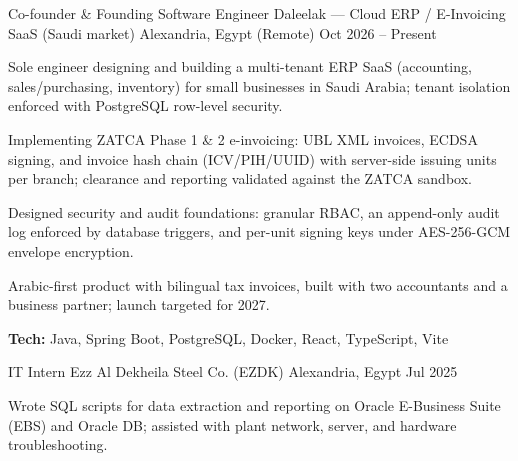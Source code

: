 
\begin{cventries}

  \cventry
    {Co-founder \& Founding Software Engineer}
    {Daleelak --- Cloud ERP / E-Invoicing SaaS (Saudi market)}
    {Alexandria, Egypt (Remote)}
    {Oct 2026 -- Present}
    {
      \begin{cvitems}
        \item {Sole engineer designing and building a multi-tenant ERP SaaS (accounting, sales/purchasing, inventory) for small businesses in Saudi Arabia; tenant isolation enforced with PostgreSQL row-level security.}
        \item {Implementing ZATCA Phase 1 \& 2 e-invoicing: UBL XML invoices, ECDSA signing, and invoice hash chain (ICV/PIH/UUID) with server-side issuing units per branch; clearance and reporting validated against the ZATCA sandbox.}
        \item {Designed security and audit foundations: granular RBAC, an append-only audit log enforced by database triggers, and per-unit signing keys under AES-256-GCM envelope encryption.}
        \item {Arabic-first product with bilingual tax invoices, built with two accountants and a business partner; launch targeted for 2027.}
        \item {\textbf{Tech:} Java, Spring Boot, PostgreSQL, Docker, React, TypeScript, Vite}
      \end{cvitems}
    }

  \entrygap
  \cventry
    {IT Intern}
    {Ezz Al Dekheila Steel Co. (EZDK)}
    {Alexandria, Egypt}
    {Jul 2025}
    {
      \begin{cvitems}
        \item {Wrote SQL scripts for data extraction and reporting on Oracle E-Business Suite (EBS) and Oracle DB; assisted with plant network, server, and hardware troubleshooting.}
      \end{cvitems}
    }

\end{cventries}
